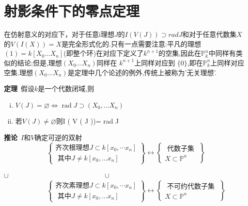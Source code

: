 \documentclass[UTF8]{book}
\begin{document}
		
	\section{射影条件下的零点定理}
		在仿射意义的对应下，对于任意i理想$ J $的$I ( V ( J )) \supset rad J$和对于任意代数集$ X $的$ V(I(X))  = X$是完全形式化的.只有一点需要注意:平凡的理想$(1) = k \left[ X _{0} \ldots X _{ n }\right]$(即整个环)在对应下定义了$k ^{ n +1}$的空集,因此在$\mathbb{P} ^{n}_{ k }$中同样有类似的结论;但是,理想$\left(X_{0} \ldots X_{n}\right)$同样在 $k ^{n+1}$上同样对应到 $\{0\}$,即在$\mathbb{P} ^{n}_{ k }$上同样对应空集.理想$\left(X_{0} \ldots X_{n}\right)$是定理中几个论述的例外,传统上被称为'无关理想'.
		
		
		\textbf{定理}\ 假设$ k $是一个代数闭域,则
		\begin{enumerate}[(i)]
			\item $ V ( J )=\varnothing  \Longleftrightarrow \operatorname{rad} J \supset\left( X _{0}, \ldots X _{ n }\right)$
			\item 若$V ( J ) \neq \varnothing$则$ $I ( V ( J ))= rad J$ $
		\end{enumerate}
		
		
		\textbf{推论}\ $ I $和$ V $确定可逆的双射
		\begin{equation*}
		\left\{\begin{array}{l}
		{\text {齐次根理想} J \subset k [x_{0}, \cdots x_{n} ]} \\
		{\text { 其中} J \neq k [x_{0}, \ldots x_{n} ]} 
		\end{array}\right\}
		 \longleftrightarrow
		 \left\{\begin{array}{c}
		{\text { 代数子集 }} \\
		{X \subset \mathbb{P} ^{n}}
		\end{array}\right\}
		\end{equation*}
		
		\centering $ \cup \qquad \qquad \qquad\qquad \qquad \qquad \qquad \cup $
		\begin{equation*}
		\qquad\quad
		\left\{\begin{array}{l}
		{\text {齐次素理想} J \subset k [x_{0}, \cdots x_{n} ]} \\
		{\text { 其中} J \neq k [x_{0}, \ldots x_{n} ]} 
		\end{array}\right\}
		\longleftrightarrow
		\left\{\begin{array}{c}
		{\text { 不可约代数子集 }} \\
		{X \subset \mathbb{P} ^{n}}
		\end{array}\right\}
		\end{equation*}
		
\end{document}
